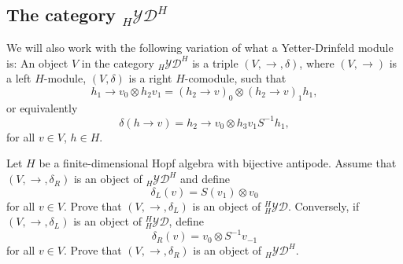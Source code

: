 
\subsection{The category $_H\mathcal{YD}^H$}

We will also work with the following variation of what a Yetter-Drinfeld module
is: An object $V$ in the category $_{H}\mathcal{YD}^{H}$ is a triple
$(V,\rightarrow,\delta)$, where $(V,\rightarrow)$ is a left $H$-module,
$(V,\delta)$ is a right $H$-comodule, such that
\[
h_{1}\rightarrow v_{0}\otimes h_{2}v_{1}=(h_{2}\rightarrow v)_{0}\otimes(h_{2}\rightarrow v)_{1}h_{1},
\]
or equivalently
\[
\delta(h\rightarrow v)=h_{2}\rightarrow v_{0}\otimes h_{3}v_{1}S^{-1}h_{1},
\]
for all $v\in V$, $h\in H$. 

%

\begin{exercise}
Let $H$ be a finite-dimensional Hopf algebra with bijective antipode.  Assume that
$(V,\rightarrow,\delta_R)$ is an object of $_{H}\mathcal{YD}^{H}$ and define
\[
\delta_L(v)=S(v_1)\otimes v_0
\]
for all $v\in V$.  Prove that
$(V,\rightarrow,\delta_L)$ is an object of $_H^H\mathcal{YD}$. 
Conversely, if $(V,\rightarrow,\delta_L)$ is an object of $_H^H\mathcal{YD}$,
define \[
\delta_R(v)=v_0\otimes S^{-1}v_{-1}
\]
for all $v\in V$. Prove that
$(V,\rightarrow,\delta_R)$ is an object of $_H\mathcal{YD}^H$.
\end{exercise}

